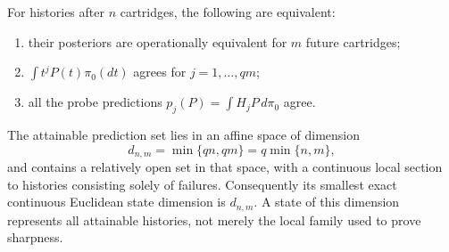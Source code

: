\begin{theorem}\label{thm:decision-quotient}
For histories after $n$ cartridges, the following are equivalent:
\begin{enumerate}
\item their posteriors are operationally equivalent for $m$ future cartridges;
\item $\int t^jP(t)\pi_0(dt)$ agrees for $j=1,\ldots,qm$;
\item all the probe predictions $p_j(P)=\int H_jP\,d\pi_0$ agree.
\end{enumerate}
The attainable prediction set lies in an affine space of dimension
\begin{equation}\label{eq:decision-dimension}
 d_{n,m}=\min\{qn,qm\}=q\min\{n,m\},
\end{equation}
and contains a relatively open set in that space, with a continuous local
section to histories consisting solely of failures. Consequently its
smallest exact continuous Euclidean state dimension is $d_{n,m}$.
A state of this dimension represents all attainable histories, not merely
the local family used to prove sharpness.
\end{theorem}
